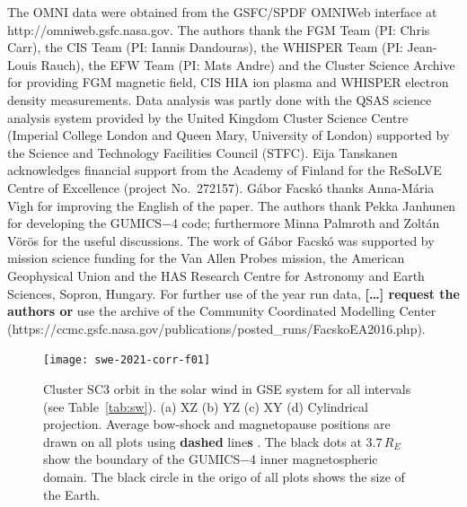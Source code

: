 \documentclass[linenumbers,draft]{agujournal}
\begin{document}
\begin{acknowledgments}
The OMNI data were obtained from the GSFC/SPDF OMNIWeb interface at http://omniweb.gsfc.nasa.gov. The authors thank the FGM Team (PI: Chris Carr), the CIS Team (PI: Iannis Dandouras), the WHISPER Team (PI: Jean-Louis Rauch), the EFW Team (PI: Mats Andre) and the Cluster Science Archive for providing FGM magnetic field, CIS HIA ion plasma and WHISPER electron density measurements. Data analysis was partly done with the QSAS science analysis system provided by the United Kingdom Cluster Science Centre (Imperial College London and Queen Mary, University of London) supported by the Science and Technology Facilities Council (STFC). Eija Tanskanen acknowledges financial support from the Academy of Finland for the ReSoLVE Centre of Excellence (project No.~272157). G{\'a}bor Facsk{\'o} thanks Anna-M\'aria V\'\i gh for improving the English of the paper. The authors thank Pekka Janhunen for developing the GUMICS$-$4 code; furthermore Minna Palmroth and Zolt{\'a}n V{\"o}r{\"o}s for the useful discussions. The work of G{\'a}bor Facsk{\'o} was supported by mission science funding for the Van Allen Probes mission, the American Geophysical Union and the HAS Research Centre for Astronomy and Earth Sciences, Sopron, Hungary. For further use of the year run data, \textbf{[\dots] request the authors or} use the archive of the Community Coordinated Modelling Center (https://ccmc.gsfc.nasa.gov/publications/posted\_runs/FacskoEA2016.php).
\end{acknowledgments}






\pagebreak

\begin{figure}[h]
\centering
\texttt{[image: swe-2021-corr-f01]}  
\caption{Cluster SC3 orbit in the solar wind in GSE system for all intervals  (see Table~\ref{tab:sw}). (a) XZ (b) YZ (c) XY (d) Cylindrical projection. Average bow-shock and magnetopause positions are drawn on all plots using \textbf{dashed} line\textbf{s} \citep[][respectively]{peredo95:_three_alfven_mach,tsyganenko95:_model_earth}. The black dots at $3.7\,R_E$ show the boundary of the GUMICS$-$4 inner magnetospheric domain. The black circle in the origo of all plots shows the size of the Earth.}
\label{fig:sworbit}
\end{figure}

\pagebreak
\end{document}
